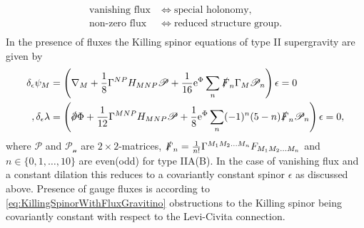 \begin{equation*}
    \begin{aligned}
    \text{vanishing flux}&\Longleftrightarrow \text{special holonomy},\\
    \text{non-zero flux}&\Longleftrightarrow \text{reduced structure group}.\\
    \end{aligned}
\end{equation*}
In the presence of fluxes the Killing spinor equations of type II supergravity are given by \cite{Blumenhagen2013}
\begin{equation}\label{eq:KillingSpinorWithFluxGravitino}
\begin{aligned}
    \delta_\epsilon \psi_M &= \left(\nabla_M+\frac{1}{8}\Gamma^{NP}H_{MNP}\mathscr{P}+\frac{1}{16}\ee^\Phi\sum_{n}\slashed{F}_n\Gamma_M\mathscr{P}_n\right)\epsilon=0\\,
    \delta_\epsilon \lambda &= \left(\slashed{\pd}\Phi+\frac{1}{12}\Gamma^{MNP}H_{MNP}\mathscr{P}+\frac{1}{8}\ee^\Phi\sum_{n}(-1)^n(5-n)\slashed{F}_n\mathscr{P}_n\right)\epsilon=0,
    \end{aligned}
\end{equation}
where $\mathscr{P}$ and $\mathscr{P_n}$ are $2\times 2$-matrices, $\slashed{F}_n=\frac{1}{n!}\Gamma^{M_1M_2\ldots M_n}F_{M_1M_2\ldots M_n}$ and $n\in\{0,1,\ldots,10\}$ are even(odd) for type IIA(B). In the case of vanishing flux and a constant dilation this reduces to a covariantly constant spinor $\epsilon$ as discussed above. Presence of gauge fluxes is according to \eqref{eq:KillingSpinorWithFluxGravitino} obstructions to the Killing spinor being covariantly constant with respect to the Levi-Civita connection. 

